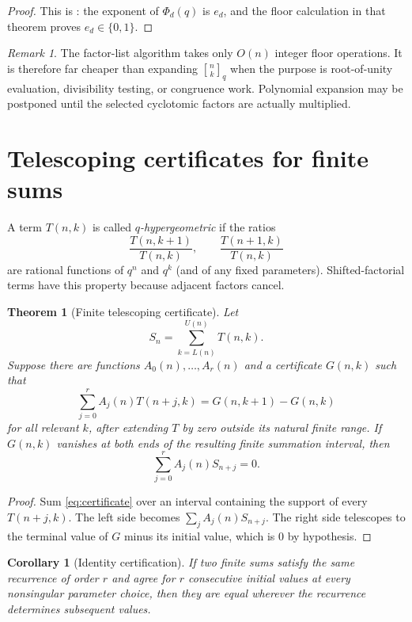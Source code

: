 \documentclass[11pt,oneside,openany]{book}
\newtheorem{theorem}{Theorem}[chapter]
\newtheorem{corollary}[corollary]{Corollary}
\theoremstyle{definition}
\theoremstyle{remark}
\newtheorem{remark}[remark]{Remark}
\newcommand{\qbinom}[2]{\genfrac{[}{]}{0pt}{}{#1}{#2}_{q}}
\begin{document}
\begin{proof}
This is : the exponent of $\Phi_d(q)$ is $e_d$, and the floor calculation in that theorem proves $e_d\in\{0,1\}$.
\end{proof}

\begin{remark}
The factor-list algorithm takes only $O(n)$ integer floor operations.  It is therefore far cheaper than expanding $\qbinom nk$ when the purpose is root-of-unity evaluation, divisibility testing, or congruence work.  Polynomial expansion may be postponed until the selected cyclotomic factors are actually multiplied.
\end{remark}

\section{Telescoping certificates for finite sums}

A term $T(n,k)$ is called \emph{$q$-hypergeometric} if the ratios
\[
 \frac{T(n,k+1)}{T(n,k)},
 \qquad
 \frac{T(n+1,k)}{T(n,k)}
\]
are rational functions of $q^n$ and $q^k$ (and of any fixed parameters).  Shifted-factorial terms have this property because adjacent factors cancel.

\begin{theorem}[Finite telescoping certificate]\label{thm:telescoping-certificate}
Let
\[
 S_n=\sum_{k=L(n)}^{U(n)}T(n,k).
\]
Suppose there are functions $A_0(n),\ldots,A_r(n)$ and a certificate $G(n,k)$ such that
\[
 \sum_{j=0}^{r}A_j(n)T(n+j,k)
 =G(n,k+1)-G(n,k)
 \tag{20.1}\label{eq:certificate}
\]
for all relevant $k$, after extending $T$ by zero outside its natural finite range.  If $G(n,k)$ vanishes at both ends of the resulting finite summation interval, then
\[
 \sum_{j=0}^{r}A_j(n)S_{n+j}=0.
 \tag{20.2}\label{eq:certified-recurrence}
\]
\end{theorem}

\begin{proof}
Sum \eqref{eq:certificate} over an interval containing the support of every $T(n+j,k)$.  The left side becomes
$\sum_jA_j(n)S_{n+j}$.  The right side telescopes to the terminal value of $G$ minus its initial value, which is $0$ by hypothesis.
\end{proof}

\begin{corollary}[Identity certification]\label{cor:identity-certification}
If two finite sums satisfy the same recurrence of order $r$ and agree for $r$ consecutive initial values at every nonsingular parameter choice, then they are equal wherever the recurrence determines subsequent values.
\end{corollary}
\end{document}
